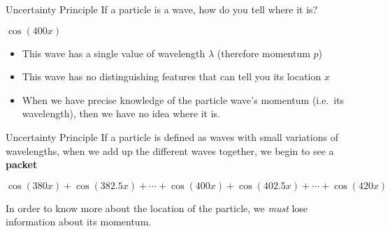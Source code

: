 \documentclass[12pt,compress,aspectratio=169]{beamer}
\begin{document}
\begin{frame}{Uncertainty Principle}
  If a particle is a wave, how do you tell where it is?
  \begin{center}
    
    {\footnotesize $\cos(400x)$}
  \end{center}
  \begin{itemize}
  \item This wave has a single value of wavelength $\lambda$ (therefore
    momentum $p$)
  \item This wave has no distinguishing features that can tell you its
    location $x$
  \item When we have precise knowledge of the particle wave's momentum (i.e.\
    its wavelength), then we have no idea where it is.
  \end{itemize} 
\end{frame}

\begin{frame}{Uncertainty Principle}
  If a particle is defined as waves with small variations of wavelengths, when
  we add up the different waves together, we begin to see a \textbf{packet}
  \begin{center}

    {\footnotesize
      $\cos(380x)+\cos(382.5x)+\cdots+\cos(400x)+
      \cos(402.5x)+\cdots+\cos(420x)$}
  \end{center}
  In order to know more about the location of the particle, we \emph{must} lose
  information about its momentum.
\end{frame}
\end{document}
